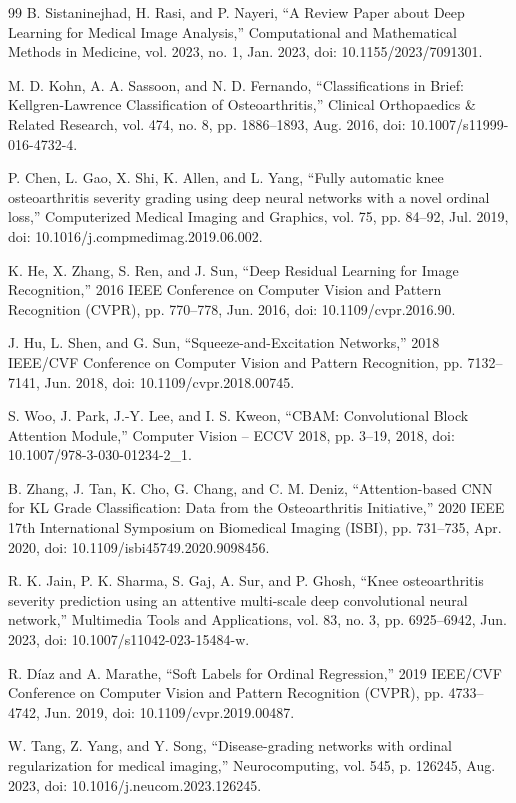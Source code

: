 \documentclass[runningheads]{llncs}
\begin{document}
\begin{thebibliography}{99}
 B. Sistaninejhad, H. Rasi, and P. Nayeri, “A Review Paper about Deep Learning for Medical Image Analysis,” Computational and Mathematical Methods in Medicine, vol. 2023, no. 1, Jan. 2023, doi: 10.1155/2023/7091301.

 M. D. Kohn, A. A. Sassoon, and N. D. Fernando, “Classifications in Brief: Kellgren-Lawrence Classification of Osteoarthritis,” Clinical Orthopaedics \& Related Research, vol. 474, no. 8, pp. 1886–1893, Aug. 2016, doi: 10.1007/s11999-016-4732-4.

 P. Chen, L. Gao, X. Shi, K. Allen, and L. Yang, “Fully automatic knee osteoarthritis severity grading using deep neural networks with a novel ordinal loss,” Computerized Medical Imaging and Graphics, vol. 75, pp. 84–92, Jul. 2019, doi: 10.1016/j.compmedimag.2019.06.002.

 K. He, X. Zhang, S. Ren, and J. Sun, “Deep Residual Learning for Image Recognition,” 2016 IEEE Conference on Computer Vision and Pattern Recognition (CVPR), pp. 770–778, Jun. 2016, doi: 10.1109/cvpr.2016.90.

 J. Hu, L. Shen, and G. Sun, “Squeeze-and-Excitation Networks,” 2018 IEEE/CVF Conference on Computer Vision and Pattern Recognition, pp. 7132–7141, Jun. 2018, doi: 10.1109/cvpr.2018.00745.

 S. Woo, J. Park, J.-Y. Lee, and I. S. Kweon, “CBAM: Convolutional Block Attention Module,” Computer Vision – ECCV 2018, pp. 3–19, 2018, doi: 10.1007/978-3-030-01234-2\_1.

 B. Zhang, J. Tan, K. Cho, G. Chang, and C. M. Deniz, “Attention-based CNN for KL Grade Classification: Data from the Osteoarthritis Initiative,” 2020 IEEE 17th International Symposium on Biomedical Imaging (ISBI), pp. 731–735, Apr. 2020, doi: 10.1109/isbi45749.2020.9098456.

 R. K. Jain, P. K. Sharma, S. Gaj, A. Sur, and P. Ghosh, “Knee osteoarthritis severity prediction using an attentive multi-scale deep convolutional neural network,” Multimedia Tools and Applications, vol. 83, no. 3, pp. 6925–6942, Jun. 2023, doi: 10.1007/s11042-023-15484-w.

 R. Díaz and A. Marathe, “Soft Labels for Ordinal Regression,” 2019 IEEE/CVF Conference on Computer Vision and Pattern Recognition (CVPR), pp. 4733–4742, Jun. 2019, doi: 10.1109/cvpr.2019.00487.

 W. Tang, Z. Yang, and Y. Song, “Disease-grading networks with ordinal regularization for medical imaging,” Neurocomputing, vol. 545, p. 126245, Aug. 2023, doi: 10.1016/j.neucom.2023.126245.


\end{thebibliography}
\end{document}
